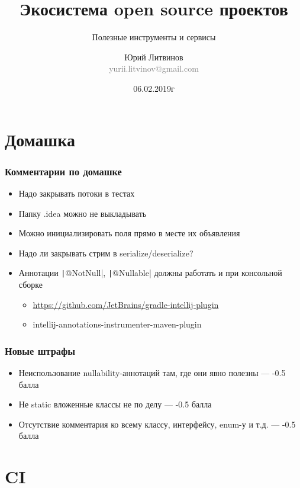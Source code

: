 \documentclass[xetex,mathserif,serif]{beamer}
\title{Экосистема open source проектов}
\subtitle{Полезные инструменты и сервисы}
\author[Юрий Литвинов]{Юрий Литвинов\\\small{\textcolor{gray}{yurii.litvinov@gmail.com}}}
\date{06.02.2019г}
\begin{document}
	\frame{\titlepage}

	\section{Домашка}

	\begin{frame}
		\frametitle{Комментарии по домашке}
		\begin{itemize}
			\item Надо закрывать потоки в тестах
			\item Папку .idea можно не выкладывать
			\item Можно инициализировать поля прямо в месте их объявления
			\item Надо ли закрывать стрим в serialize/deserialize?
			\item Аннотации \texttt|@NotNull|, \texttt|@Nullable| должны работать и при консольной сборке
			\begin{itemize}
				\item \url{https://github.com/JetBrains/gradle-intellij-plugin}
				\item intellij-annotations-instrumenter-maven-plugin
			\end{itemize}
		\end{itemize}
	\end{frame}

	\begin{frame}
		\frametitle{Новые штрафы}
		\begin{itemize}
			\item Неиспользование nullability-аннотаций там, где они явно полезны --- -0.5 балла
			\item Не static вложенные классы не по делу --- -0.5 балла
			\item Отсутствие комментария ко всему классу, интерфейсу, enum-у и т.д. --- -0.5 балла
		\end{itemize}
	\end{frame}

	\section{CI}
\end{document}
